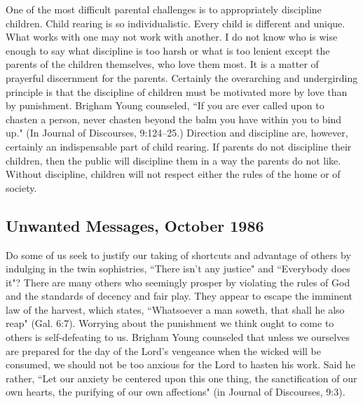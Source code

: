 One of the most difficult parental challenges is to appropriately discipline children. Child rearing is so individualistic. Every child is different and unique. What works with one may not work with another. I do not know who is wise enough to say what discipline is too harsh or what is too lenient except the parents of the children themselves, who love them most. It is a matter of prayerful discernment for the parents. Certainly the overarching and undergirding principle is that the discipline of children must be motivated more by love than by punishment. Brigham Young counseled, ``If you are ever called upon to chasten a person, never chasten beyond the balm you have within you to bind up." (In Journal of Discourses, 9:124–25.) Direction and discipline are, however, certainly an indispensable part of child rearing. If parents do not discipline their children, then the public will discipline them in a way the parents do not like. Without discipline, children will not respect either the rules of the home or of society.

\subsection{Unwanted Messages, October 1986}

Do some of us seek to justify our taking of shortcuts and advantage of others by indulging in the twin sophistries, ``There isn't any justice" and ``Everybody does it"? There are many others who seemingly prosper by violating the rules of God and the standards of decency and fair play. They appear to escape the imminent law of the harvest, which states, ``Whatsoever a man soweth, that shall he also reap" (Gal. 6:7). Worrying about the punishment we think ought to come to others is self-defeating to us. Brigham Young counseled that unless we ourselves are prepared for the day of the Lord's vengeance when the wicked will be consumed, we should not be too anxious for the Lord to hasten his work. Said he rather, ``Let our anxiety be centered upon this one thing, the sanctification of our own hearts, the purifying of our own affections" (in Journal of Discourses, 9:3).